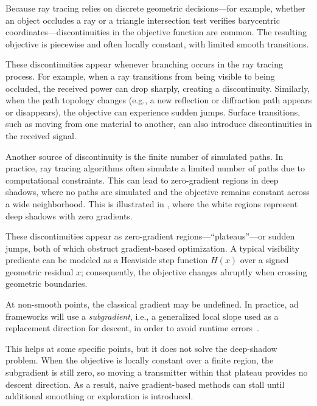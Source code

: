Because ray tracing relies on discrete geometric decisions---for example, whether an object occludes a ray or a triangle intersection test verifies barycentric coordinates---discontinuities in the objective function are common. The resulting objective is piecewise and often locally constant, with limited smooth transitions.

These discontinuities appear whenever branching occurs in the ray tracing process. For example, when a ray transitions from being visible to being occluded, the received power can drop sharply, creating a discontinuity. Similarly, when the path topology changes (e.g., a new reflection or diffraction path appears or disappears), the objective can experience sudden jumps. Surface transitions, such as moving from one material to another, can also introduce discontinuities in the received signal.

Another source of discontinuity is the finite number of simulated paths. In practice, ray tracing algorithms often simulate a limited number of paths due to computational constraints. This can lead to zero-gradient regions in deep shadows, where no paths are simulated and the objective remains constant across a wide neighborhood. This is illustrated in , where the white regions represent deep shadows with zero gradients.

These discontinuities appear as zero-gradient regions---\enquote{plateaus}---or sudden jumps, both of which obstruct gradient-based optimization. A typical visibility predicate can be modeled as a Heaviside step function $H(x)$ over a signed geometric residual $x$; consequently, the objective changes abruptly when crossing geometric boundaries.

At non-smooth points, the classical gradient may be undefined. In practice, \gls{ad} frameworks will use a \emph{subgradient}, i.e., a generalized local slope used as a replacement direction for descent, in order to avoid runtime errors~.

This helps at some specific points, but it does not solve the deep-shadow problem. When the objective is locally constant over a finite region, the subgradient is still zero, so moving a transmitter within that plateau provides no descent direction. As a result, naive gradient-based methods can stall until additional smoothing or exploration is introduced.

